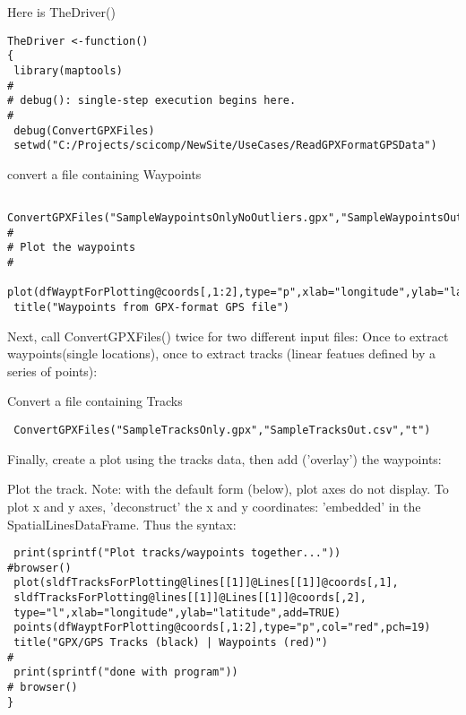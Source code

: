 \documentclass{beamer}
\begin{document}
\begin{frame}[fragile]
Here is TheDriver()

\begin{framed}
\begin{verbatim}
TheDriver <-function()
{
 library(maptools)
#
# debug(): single-step execution begins here.
#
 debug(ConvertGPXFiles)
 setwd("C:/Projects/scicomp/NewSite/UseCases/ReadGPXFormatGPSData")
\end{verbatim}
\end{framed}
\end{frame}
\begin{frame}[fragile]
 convert a file containing Waypoints
\begin{verbatim}
 ConvertGPXFiles("SampleWaypointsOnlyNoOutliers.gpx","SampleWaypointsOut.csv","w")
#
# Plot the waypoints 
# 
 plot(dfWayptForPlotting@coords[,1:2],type="p",xlab="longitude",ylab="latitude")
 title("Waypoints from GPX-format GPS file")
 \end{verbatim}
Next, call ConvertGPXFiles() twice for two different input files: Once to extract waypoints(single locations), once to extract tracks (linear featues defined by a series of points):

\end{frame}

\begin{frame}[fragile]
Convert a file containing Tracks
\begin{verbatim}
 ConvertGPXFiles("SampleTracksOnly.gpx","SampleTracksOut.csv","t")
\end{verbatim}
Finally, create a plot using the tracks data, then add ('overlay') the waypoints:
\end{frame}

\begin{frame}[fragile]

 Plot the track. Note: with the default form (below), plot axes do not display. 
 To plot x and y axes, 'deconstruct' the x and y coordinates:
 'embedded' in the SpatialLinesDataFrame. Thus the syntax:
\end{frame}

\begin{frame}[fragile] 
\begin{framed}
\begin{verbatim}
 print(sprintf("Plot tracks/waypoints together..."))
#browser()
 plot(sldfTracksForPlotting@lines[[1]]@Lines[[1]]@coords[,1],
 sldfTracksForPlotting@lines[[1]]@Lines[[1]]@coords[,2],
 type="l",xlab="longitude",ylab="latitude",add=TRUE)
 points(dfWayptForPlotting@coords[,1:2],type="p",col="red",pch=19) 
 title("GPX/GPS Tracks (black) | Waypoints (red)") 
# 
 print(sprintf("done with program"))
# browser()
}
\end{verbatim}
\end{framed}
\end{frame}
\end{document}
